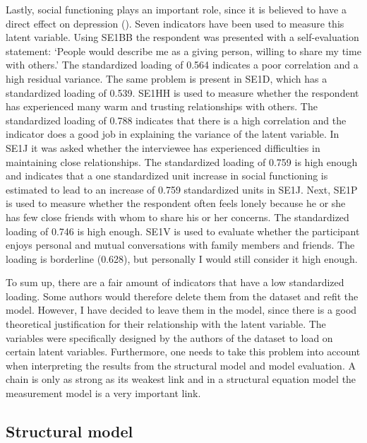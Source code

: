 \documentclass[11pt]{article}
\begin{document}
Lastly, social functioning plays an important role, since it is believed to have
a direct effect on depression (\cite{tse2011}). Seven indicators have been used
to measure this latent variable.
Using SE1BB the respondent was presented with a self-evaluation statement:
`People would describe me as a giving person, willing to share my time with
others.' The standardized loading of 0.564 indicates a poor correlation and a
high residual variance.
The same problem is present in SE1D, which has a standardized loading of 0.539.
SE1HH is used to measure whether the respondent has experienced many warm and
trusting relationships with others. The standardized loading of 0.788 indicates that there
is a high correlation and the indicator does a good job in explaining the variance
of the latent variable.
In SE1J it was asked whether the interviewee has experienced difficulties in
maintaining close relationships. The standardized loading of 0.759 is high enough
and indicates that a one standardized unit increase in social functioning is
estimated to lead to an increase of 0.759 standardized units in SE1J.
Next, SE1P is used to measure whether the respondent often feels lonely because
he or she has few close friends with whom to share his or her concerns. The
standardized loading of 0.746 is high enough.
SE1V is used to evaluate whether the participant enjoys personal and
mutual conversations with family members and friends. The loading is borderline
(0.628), but personally I would still consider it high enough.

To sum up, there are a fair amount of indicators that have a low standardized
loading. Some authors would therefore delete them from the dataset and refit the
model. However, I have decided to leave them in the model, since there is a good
theoretical justification for their relationship with the latent variable. The
variables were specifically designed by the authors of the dataset to load on
certain latent variables. Furthermore, one needs to take this problem into
account when interpreting the results from the structural model and model
evaluation. A chain is only as strong as its weakest link and in a structural
equation model the measurement model is a very important link.

\FloatBarrier
\subsection{Structural model}
\end{document}
